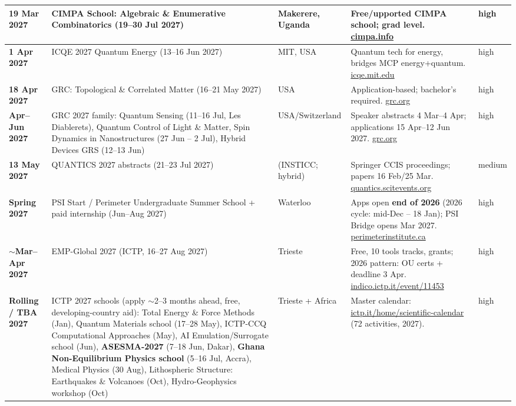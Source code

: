 \documentclass[11pt,a4paper]{article}
\begin{document}
\begin{longtable}{@{}p{3.2cm}p{3.0cm}p{2.5cm}p{5.2cm}p{1.6cm}@{}}
\midrule
\textbf{19 Mar 2027} & CIMPA School: Algebraic \& Enumerative Combinatorics (19--30 Jul 2027) & Makerere, Uganda & Free/upported CIMPA school; grad level. \href{https://www.cimpa.info/en/ecoles/algebraic-and-enumerative-combinatorics}{cimpa.info} & high \\
\midrule
\textbf{1 Apr 2027} & ICQE 2027 Quantum Energy (13--16 Jun 2027) & MIT, USA & Quantum tech for energy, bridges MCP energy+quantum. \href{https://icqe.mit.edu/submit-abstract/}{icqe.mit.edu} & high \\
\midrule
\textbf{18 Apr 2027} & GRC: Topological \& Correlated Matter (16--21 May 2027) & USA & Application-based; bachelor's required. \href{https://www.grc.org/topological-and-correlated-matter-conference/2027/}{grc.org} & high \\
\midrule
\textbf{Apr--Jun 2027} & GRC 2027 family: Quantum Sensing (11--16 Jul, Les Diablerets), Quantum Control of Light \& Matter, Spin Dynamics in Nanostructures (27 Jun -- 2 Jul), Hybrid Devices GRS (12--13 Jun) & USA/Switzerland & Speaker abstracts 4 Mar--4 Apr; applications 15 Apr--12 Jun 2027. \href{https://www.grc.org/quantum-sensing-conference/2027/}{grc.org} & high \\
\midrule
\textbf{13 May 2027} & QUANTICS 2027 abstracts (21--23 Jul 2027) & (INSTICC; hybrid) & Springer CCIS proceedings; papers 16 Feb/25 Mar. \href{https://quantics.scitevents.org/}{quantics.scitevents.org} & medium \\
\midrule
\textbf{Spring 2027} & PSI Start / Perimeter Undergraduate Summer School + paid internship (Jun--Aug 2027) & Waterloo & Apps open \textbf{end of 2026} (2026 cycle: mid-Dec -- 18 Jan); PSI Bridge opens Mar 2027. \href{https://perimeterinstitute.ca/undergraduate-summer-programs}{perimeterinstitute.ca} & high \\
\midrule
\textbf{$\sim$Mar--Apr 2027} & EMP-Global 2027 (ICTP, 16--27 Aug 2027) & Trieste & Free, 10 tools tracks, grants; 2026 pattern: OU certs + deadline 3 Apr. \href{https://indico.ictp.it/event/11453}{indico.ictp.it/event/11453} & high \\
\midrule
\textbf{Rolling / TBA 2027} & ICTP 2027 schools (apply $\sim$2--3 months ahead, free, developing-country aid): Total Energy \& Force Methods (Jan), Quantum Materials school (17--28 May), ICTP-CCQ Computational Approaches (May), AI Emulation/Surrogate school (Jun), \textbf{ASESMA-2027} (7--18 Jun, Dakar), \textbf{Ghana Non-Equilibrium Physics school} (5--16 Jul, Accra), Medical Physics (30 Aug), Lithospheric Structure: Earthquakes \& Volcanoes (Oct), Hydro-Geophysics workshop (Oct) & Trieste + Africa & Master calendar: \href{https://www.ictp.it/home/scientific-calendar}{ictp.it/home/scientific-calendar} (72 activities, 2027). & high \\

\end{longtable}
\end{document}
